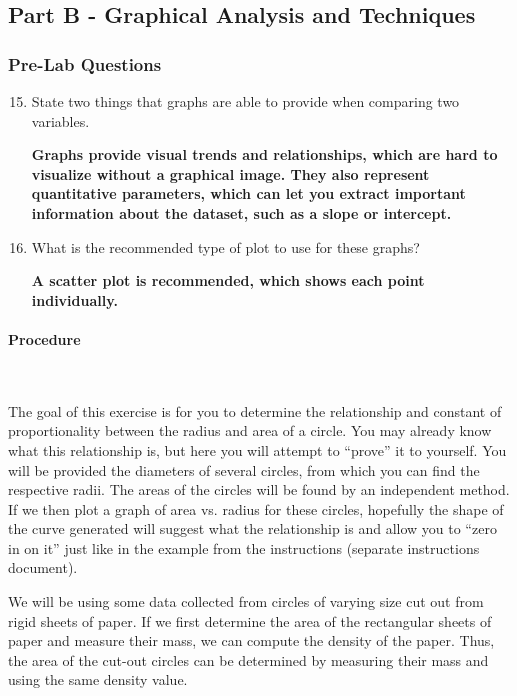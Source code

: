
\subsection{Part B - Graphical Analysis and Techniques}

\subsubsection{Pre-Lab Questions}

\begin{enumerate}
	\setcounter{enumi}{14}
	\item State two things that graphs are able to provide when comparing two variables.

	      \textbf{Graphs provide visual trends and relationships, which are hard to visualize without a graphical image. They also represent quantitative parameters, which can let you extract important information about the dataset, such as a slope or intercept.}

	\item What is the recommended type of plot to use for these graphs?

	      \textbf{A scatter plot is recommended, which shows each point individually.}

\end{enumerate}

\paragraph{Procedure}~

The goal of this exercise is for you to determine the relationship and constant of proportionality between the radius and area of a circle. You may already know what this relationship is, but here you will attempt to “prove” it to yourself. You will be provided the diameters of several circles, from which you can find the respective radii. The areas of the circles will be found by an independent method. If we then plot a graph of area vs. radius for these circles, hopefully the shape of the curve generated will suggest what the relationship is and allow you to “zero in on it” just like in the example from the instructions (separate instructions document).

We will be using some data collected from circles of varying size cut out from rigid sheets of paper. If we first determine the area of the rectangular sheets of paper and measure their mass, we can compute the density of the paper. Thus, the area of the cut-out circles can be determined by measuring their mass and using the same density value.

